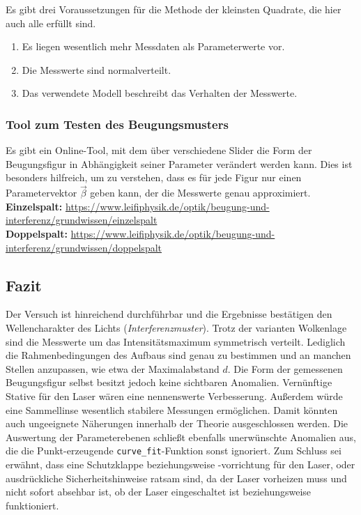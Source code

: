 Es gibt drei Voraussetzungen für die Methode der kleinsten Quadrate, die hier auch alle erfüllt sind.
\begin{enumerate}
    \item Es liegen wesentlich mehr Messdaten als Parameterwerte vor.
    \item Die Messwerte sind normalverteilt.
    \item Das verwendete Modell beschreibt das Verhalten der Messwerte.
\end{enumerate}

\subsubsection{Tool zum Testen des Beugungsmusters}
Es gibt ein Online-Tool, mit dem über verschiedene Slider die Form der Beugungsfigur in Abhängigkeit seiner Parameter verändert werden kann.
Dies ist besonders hilfreich, um zu verstehen, dass es für jede Figur nur einen Parametervektor $\vec{\beta}$ geben kann, der die Messwerte genau approximiert.\\
\textbf{Einzelspalt:} \url{https://www.leifiphysik.de/optik/beugung-und-interferenz/grundwissen/einzelspalt}\\
\textbf{Doppelspalt:} \url{https://www.leifiphysik.de/optik/beugung-und-interferenz/grundwissen/doppelspalt}

\subsection{Fazit}
Der Versuch ist hinreichend durchführbar und die Ergebnisse bestätigen den Wellencharakter des Lichts (\textit{Interferenzmuster}).
Trotz der varianten Wolkenlage sind die Messwerte um das Intensitätsmaximum symmetrisch verteilt.
Lediglich die Rahmenbedingungen des Aufbaus sind genau zu bestimmen und an manchen Stellen anzupassen, wie etwa der Maximalabstand $d$. Die Form der gemessenen Beugungsfigur selbst besitzt jedoch keine sichtbaren Anomalien.
Vernünftige Stative für den Laser wären eine nennenswerte Verbesserung. Außerdem würde eine Sammellinse wesentlich stabilere Messungen ermöglichen. Damit könnten auch ungeeignete Näherungen innerhalb der Theorie ausgeschlossen werden.
Die Auswertung der Parameterebenen schließt ebenfalls unerwünschte Anomalien aus, die die Punkt-erzeugende \texttt{curve\_fit}-Funktion sonst ignoriert. 
Zum Schluss sei erwähnt, dass eine Schutzklappe beziehungsweise -vorrichtung für den Laser, oder ausdrückliche Sicherheitshinweise ratsam sind, da der Laser vorheizen muss und nicht sofort absehbar ist, ob der Laser eingeschaltet
ist beziehungsweise funktioniert.